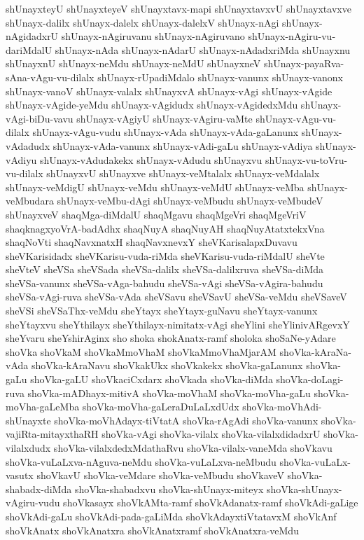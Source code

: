 {shUnayxteyU
shUnayxteyeV
shUnayxtavx-mapi
shUnayxtavxvU
shUnayxtavxve
shUnayx-dalilx
shUnayx-dalelx
shUnayx-dalelxV
shUnayx-nAgi
shUnayx-nAgidadxrU
shUnayx-nAgiruvanu
shUnayx-nAgiruvano
shUnayx-nAgiru-vu-dariMdalU
shUnayx-nAda
shUnayx-nAdarU
shUnayx-nAdadxriMda
shUnayxnu
shUnayxnU
shUnayx-neMdu
shUnayx-neMdU
shUnayxneV
shUnayx-payaRva-sAna-vAgu-vu-dilalx
shUnayx-rUpadiMdalo
shUnayx-vanunx
shUnayx-vanonx
shUnayx-vanoV
shUnayx-valalx
shUnayxvA
shUnayx-vAgi
shUnayx-vAgide
shUnayx-vAgide-yeMdu
shUnayx-vAgidudx
shUnayx-vAgidedxMdu
shUnayx-vAgi-biDu-vavu
shUnayx-vAgiyU
shUnayx-vAgiru-vaMte
shUnayx-vAgu-vu-dilalx
shUnayx-vAgu-vudu
shUnayx-vAda
shUnayx-vAda-gaLanunx
shUnayx-vAdadudx
shUnayx-vAda-vanunx
shUnayx-vAdi-gaLu
shUnayx-vAdiya
shUnayx-vAdiyu
shUnayx-vAdudakekx
shUnayx-vAdudu
shUnayxvu
shUnayx-vu-toVru-vu-dilalx
shUnayxvU
shUnayxve
shUnayx-veMtalalx
shUnayx-veMdalalx
shUnayx-veMdigU
shUnayx-veMdu
shUnayx-veMdU
shUnayx-veMba
shUnayx-veMbudara
shUnayx-veMbu-dAgi
shUnayx-veMbudu
shUnayx-veMbudeV
shUnayxveV
shaqMga-diMdalU
shaqMgavu
shaqMgeVri
shaqMgeVriV
shaqknagxyoVrA-badAdhx
shaqNuyA
shaqNuyAH
shaqNuyAtatxtekxVna
shaqNoVti
shaqNavxnatxH
shaqNavxnevxY
sheVKarisalapxDuvavu
sheVKarisidadx
sheVKarisu-vuda-riMda
sheVKarisu-vuda-riMdalU
sheVte
sheVteV
sheVSa
sheVSada
sheVSa-dalilx
sheVSa-dalilxruva
sheVSa-diMda
sheVSa-vanunx
sheVSa-vAga-bahudu
sheVSa-vAgi
sheVSa-vAgira-bahudu
sheVSa-vAgi-ruva
sheVSa-vAda
sheVSavu
sheVSavU
sheVSa-veMdu
sheVSaveV
sheVSi
sheVSaThx-veMdu
sheYtayx
sheYtayx-guNavu
sheYtayx-vanunx
sheYtayxvu
sheYthilayx
sheYthilayx-nimitatx-vAgi
sheYlini
sheYlinivARgevxY
sheYvaru
sheYshirAginx
sho
shoka
shokAnatx-ramf
sholoka
shoSaNe-yAdare
shoVka
shoVkaM
shoVkaMmoVhaM
shoVkaMmoVhaMjarAM
shoVka-kAraNa-vAda
shoVka-kAraNavu
shoVkakUkx
shoVkakekx
shoVka-gaLanunx
shoVka-gaLu
shoVka-gaLU
shoVkaciCxdarx
shoVkada
shoVka-diMda
shoVka-doLagi-ruva
shoVka-mADhayx-mitivA
shoVka-moVhaM
shoVka-moVha-gaLu
shoVka-moVha-gaLeMba
shoVka-moVha-gaLeraDuLaLxdUdx
shoVka-moVhAdi-shUnayxte
shoVka-moVhAdayx-tiVtatA
shoVka-rAgAdi
shoVka-vanunx
shoVka-vajiRta-mitayxthaRH
shoVka-vAgi
shoVka-vilalx
shoVka-vilalxdidadxrU
shoVka-vilalxdudx
shoVka-vilalxdedxMdathaRvu
shoVka-vilalx-vaneMda
shoVkavu
shoVka-vuLaLxva-nAguva-neMdu
shoVka-vuLaLxva-neMbudu
shoVka-vuLaLx-vasutx
shoVkavU
shoVka-veMdare
shoVka-veMbudu
shoVkaveV
shoVka-shabadx-diMda
shoVka-shabadxvu
shoVka-shUnayx-miteyx
shoVka-shUnayx-vAgiru-vudu
shoVkasayx
shoVkAMta-ramf
shoVkAdanatx-ramf
shoVkAdi-gaLige
shoVkAdi-gaLu
shoVkAdi-pada-gaLiMda
shoVkAdayxtiVtatavxM
shoVkAnf
shoVkAnatx
shoVkAnatxra
shoVkAnatxramf
shoVkAnatxra-veMdu
}
